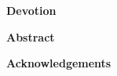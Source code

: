 


  \cleardoublepage {}
  \begin{center} \Large \textbf{Devotion} \end{center}



  \cleardoublepage
   
  \begin{center} \Large \textbf{Abstract} \end{center}
  \resumenIngles




  \cleardoublepage {}
  \begin{center} \Large \textbf{Acknowledgements} 
  
  \end{center}



  \cleardoublepage
  \tableofcontents
  \cleardoublepage
  \listoffigures
  \cleardoublepage
  \listoftables
  \cleardoublepage

  \normalsize

